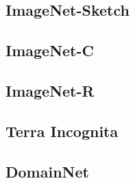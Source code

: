 \subsection{ImageNet-Sketch}
\citet{WangGLX19}


\subsection{ImageNet-C}
\citet{HendrycksD19}

\subsection{ImageNet-R}
\citet{hendrycks2020faces}

\subsection{Terra Incognita}

\subsection{DomainNet}







